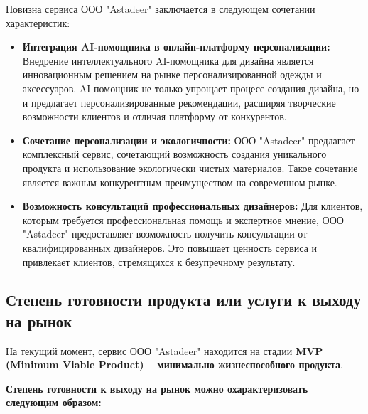 Новизна сервиса ООО "Astadeer" заключается в следующем сочетании характеристик:

\begin{itemize}
    \item \textbf{Интеграция AI-помощника в онлайн-платформу персонализации:}  Внедрение интеллектуального AI-помощника для дизайна является инновационным решением на рынке персонализированной одежды и аксессуаров.  AI-помощник не только упрощает процесс создания дизайна, но и предлагает персонализированные рекомендации, расширяя творческие возможности клиентов и отличая платформу от конкурентов.
    \item \textbf{Сочетание персонализации и экологичности:}  ООО "Astadeer" предлагает комплексный сервис, сочетающий возможность создания уникального продукта и использование экологически чистых материалов.  Такое сочетание является важным конкурентным преимуществом на современном рынке.
    \item \textbf{Возможность консультаций профессиональных дизайнеров:}  Для клиентов, которым требуется профессиональная помощь и экспертное мнение, ООО "Astadeer" предоставляет возможность получить консультации от квалифицированных дизайнеров. Это повышает ценность сервиса и привлекает клиентов, стремящихся к безупречному результату.
\end{itemize}

\subsection{Степень готовности продукта или услуги к выходу на рынок}

На текущий момент, сервис ООО "Astadeer" находится на стадии \textbf{MVP (Minimum Viable Product) – минимально жизнеспособного продукта}.

\vspace{0.3cm}

\textbf{Степень готовности к выходу на рынок можно охарактеризовать следующим образом:}

